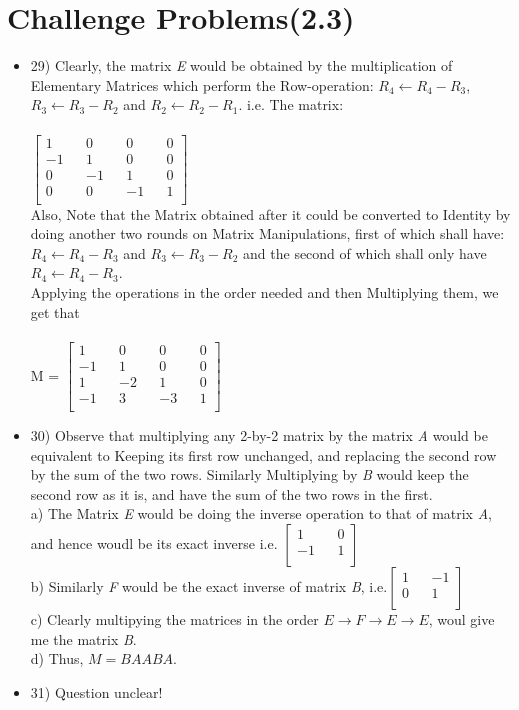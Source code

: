 \documentclass{article}
\begin{document}
\section{Challenge Problems(2.3)}
\begin{itemize}
  \item 29) Clearly, the matrix \textit{E} would be obtained by the multiplication of Elementary Matrices which perform the Row-operation: $R_4 \leftarrow R_4 - R_3$, $R_3 \leftarrow R_3 - R_2$ and $R_2 \leftarrow R_2 - R_1$. i.e. The matrix: \\ \\
  $\begin{bmatrix}
    1 && 0 && 0 && 0 \\
    -1 && 1 && 0 && 0 \\
    0 && -1 && 1 && 0 \\
    0 && 0 && -1 && 1 \\
  \end{bmatrix}$ \\
  Also, Note that the Matrix obtained after it could be converted to Identity by doing another two rounds on Matrix Manipulations, first of which shall have:   $R_4 \leftarrow R_4 - R_3$ and $R_3 \leftarrow R_3 - R_2$ and the second of which shall only have $R_4 \leftarrow R_4 - R_3$. \\
  Applying the operations in the order needed and then Multiplying them, we get that \\ \\
  M = $\begin{bmatrix}
  1 && 0 && 0 && 0 \\
  -1 && 1 && 0 && 0 \\
  1 && -2 && 1 && 0 \\
  -1 && 3 && -3 && 1 \\
  \end{bmatrix}$
  \item 30) Observe that multiplying any 2-by-2 matrix by the matrix \textit{A} would be equivalent to Keeping its first row  unchanged, and replacing the second row by the sum of the two rows. Similarly Multiplying by \textit{B} would keep the second row as it is, and have the sum of the two rows in the first. \\
  a) The Matrix \textit{E} would be doing the inverse operation to that of matrix \textit{A}, and hence woudl be its exact inverse i.e. $\begin{bmatrix} 1 && 0 \\ -1 && 1 \\ \end{bmatrix}$ \\
  b) Similarly \textit{F} would be the exact inverse of matrix \textit{B}, i.e.$\begin{bmatrix} 1 && -1 \\ 0 && 1 \\ \end{bmatrix}$ \\
  c) Clearly multipying the matrices in the order $E \rightarrow F \rightarrow E \rightarrow E$, woul give me the matrix \textit{B}. \\
  d) Thus, $M = BAABA$.
  \item 31) Question unclear!


\end{itemize}
\end{document}
